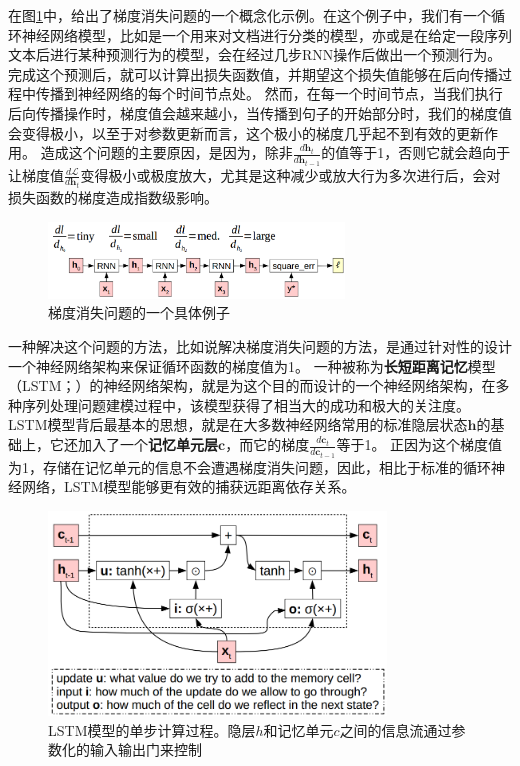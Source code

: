 \documentclass[10pt,a4paper]{ctexart}
\begin{document}
在图\ref{fig:16}中，给出了梯度消失问题的一个概念化示例。在这个例子中，我们有一个循环神经网络模型，比如是一个用来对文档进行分类的模型，亦或是在给定一段序列文本后进行某种预测行为的模型，会在经过几步RNN操作后做出一个预测行为。
完成这个预测后，就可以计算出损失函数值，并期望这个损失值能够在后向传播过程中传播到神经网络的每个时间节点处。
然而，在每一个时间节点，当我们执行后向传播操作时，梯度值会越来越小，当传播到句子的开始部分时，我们的梯度值会变得极小，以至于对参数更新而言，这个极小的梯度几乎起不到有效的更新作用。
造成这个问题的主要原因，是因为，除非$\frac{d\textbf{h}_{t}}{d\textbf{h}_{t-1}}$的值等于1，否则它就会趋向于让梯度值$\frac{d\mathcal{L}}{d\textbf{h}_t}$变得极小或极度放大，尤其是这种减少或放大行为多次进行后，会对损失函数的梯度造成指数级影响。

\begin{figure}[H]
\centering
\includegraphics[width=0.7\textwidth]{fig16.png}
\caption{梯度消失问题的一个具体例子}
\label{fig:16}
\end{figure}

一种解决这个问题的方法，比如说解决梯度消失问题的方法，是通过针对性的设计一个神经网络架构来保证循环函数的梯度值为1。
一种被称为\textbf{长短距离记忆}模型（LSTM；\cite{hochreiter1997long}）的神经网络架构，就是为这个目的而设计的一个神经网络架构，在多种序列处理问题建模过程中，该模型获得了相当大的成功和极大的关注度。
LSTM模型背后最基本的思想，就是在大多数神经网络常用的标准隐层状态$\textbf{h}$的基础上，它还加入了一个\textbf{记忆单元层}$\textbf{c}$，而它的梯度$\frac{d\textbf{c}_t}{d\textbf{c}_{t-1}}$等于1。
正因为这个梯度值为1，存储在记忆单元的信息不会遭遇梯度消失问题，因此，相比于标准的循环神经网络，LSTM模型能够更有效的捕获远距离依存关系。

\begin{figure}[H]
\centering
\includegraphics[width=0.8\textwidth]{fig17.png}
\caption{LSTM模型的单步计算过程。隐层\textbf{$h$}和记忆单元\textbf{$c$}之间的信息流通过参数化的输入输出门来控制}
\label{fig:17}
\end{figure}
\end{document}
